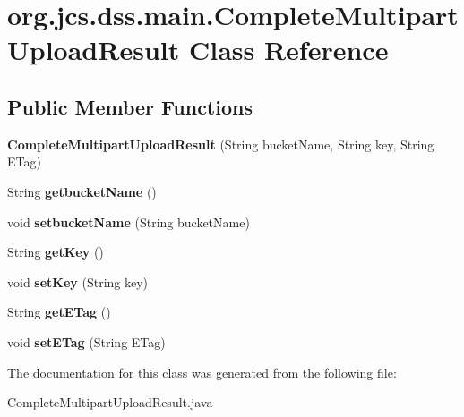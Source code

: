 \hypertarget{classorg_1_1jcs_1_1dss_1_1main_1_1CompleteMultipartUploadResult}{}\section{org.\+jcs.\+dss.\+main.\+Complete\+Multipart\+Upload\+Result Class Reference}
\label{classorg_1_1jcs_1_1dss_1_1main_1_1CompleteMultipartUploadResult}
\subsection*{Public Member Functions}
\begin{DoxyCompactItemize}
\item 
{\bfseries Complete\+Multipart\+Upload\+Result} (String bucket\+Name, String key, String E\+Tag)\hypertarget{classorg_1_1jcs_1_1dss_1_1main_1_1CompleteMultipartUploadResult_ab9548432e5f0d7f277e591ef842cd4fc}{}\label{classorg_1_1jcs_1_1dss_1_1main_1_1CompleteMultipartUploadResult_ab9548432e5f0d7f277e591ef842cd4fc}

\item 
String {\bfseries getbucket\+Name} ()\hypertarget{classorg_1_1jcs_1_1dss_1_1main_1_1CompleteMultipartUploadResult_ad86c5010ae0b82f2edbe07cad0d48a1d}{}\label{classorg_1_1jcs_1_1dss_1_1main_1_1CompleteMultipartUploadResult_ad86c5010ae0b82f2edbe07cad0d48a1d}

\item 
void {\bfseries setbucket\+Name} (String bucket\+Name)\hypertarget{classorg_1_1jcs_1_1dss_1_1main_1_1CompleteMultipartUploadResult_a641a5baf4a0db2e0ae3ee547507cbd0d}{}\label{classorg_1_1jcs_1_1dss_1_1main_1_1CompleteMultipartUploadResult_a641a5baf4a0db2e0ae3ee547507cbd0d}

\item 
String {\bfseries get\+Key} ()\hypertarget{classorg_1_1jcs_1_1dss_1_1main_1_1CompleteMultipartUploadResult_aaf784bdb0a8038dbe369badc6da36398}{}\label{classorg_1_1jcs_1_1dss_1_1main_1_1CompleteMultipartUploadResult_aaf784bdb0a8038dbe369badc6da36398}

\item 
void {\bfseries set\+Key} (String key)\hypertarget{classorg_1_1jcs_1_1dss_1_1main_1_1CompleteMultipartUploadResult_a1bc12b45a01fd32bcdd6ae7f28e05f4b}{}\label{classorg_1_1jcs_1_1dss_1_1main_1_1CompleteMultipartUploadResult_a1bc12b45a01fd32bcdd6ae7f28e05f4b}

\item 
String {\bfseries get\+E\+Tag} ()\hypertarget{classorg_1_1jcs_1_1dss_1_1main_1_1CompleteMultipartUploadResult_af3497d238806aafd9edb5151795592d8}{}\label{classorg_1_1jcs_1_1dss_1_1main_1_1CompleteMultipartUploadResult_af3497d238806aafd9edb5151795592d8}

\item 
void {\bfseries set\+E\+Tag} (String E\+Tag)\hypertarget{classorg_1_1jcs_1_1dss_1_1main_1_1CompleteMultipartUploadResult_a2da48b91d465dbe5e23a3af34682bc6c}{}\label{classorg_1_1jcs_1_1dss_1_1main_1_1CompleteMultipartUploadResult_a2da48b91d465dbe5e23a3af34682bc6c}

\end{DoxyCompactItemize}


The documentation for this class was generated from the following file\+:\begin{DoxyCompactItemize}
\item 
Complete\+Multipart\+Upload\+Result.\+java\end{DoxyCompactItemize}
